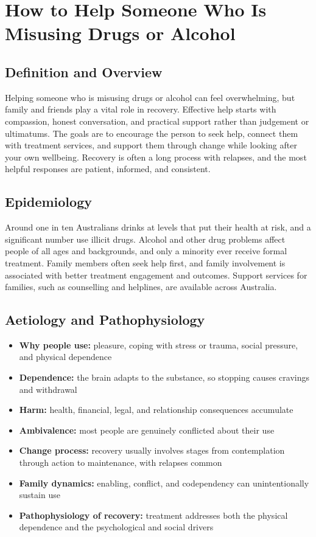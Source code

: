 \chapter{How to Help Someone Who Is Misusing Drugs or Alcohol}

\section*{Definition and Overview}
Helping someone who is misusing drugs or alcohol can feel overwhelming, but family and friends play a vital role in recovery. Effective help starts with compassion, honest conversation, and practical support rather than judgement or ultimatums. The goals are to encourage the person to seek help, connect them with treatment services, and support them through change while looking after your own wellbeing. Recovery is often a long process with relapses, and the most helpful responses are patient, informed, and consistent.

\section*{Epidemiology}
Around one in ten Australians drinks at levels that put their health at risk, and a significant number use illicit drugs. Alcohol and other drug problems affect people of all ages and backgrounds, and only a minority ever receive formal treatment. Family members often seek help first, and family involvement is associated with better treatment engagement and outcomes. Support services for families, such as counselling and helplines, are available across Australia.

\section*{Aetiology and Pathophysiology}
\begin{itemize}
    \item \textbf{Why people use:} pleasure, coping with stress or trauma, social pressure, and physical dependence
    \item \textbf{Dependence:} the brain adapts to the substance, so stopping causes cravings and withdrawal
    \item \textbf{Harm:} health, financial, legal, and relationship consequences accumulate
    \item \textbf{Ambivalence:} most people are genuinely conflicted about their use
    \item \textbf{Change process:} recovery usually involves stages from contemplation through action to maintenance, with relapses common
    \item \textbf{Family dynamics:} enabling, conflict, and codependency can unintentionally sustain use
    \item \textbf{Pathophysiology of recovery:} treatment addresses both the physical dependence and the psychological and social drivers
\end{itemize}

